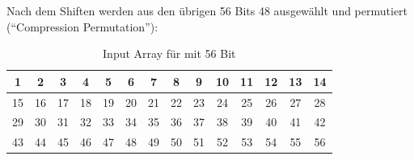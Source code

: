 Nach dem Shiften werden aus den übrigen 56 Bits 48 ausgewählt und permutiert (``Compression Permutation''):

\begin{table}[h]
    \centering
    \begin{tabular}{|*{14}{c|}}
        \hline
        \cellcolor{red-1}1 & \cellcolor{red-1}2 & \cellcolor{red-1}3 & \cellcolor{red-1}4 & 
        \cellcolor{red-1}5 & \cellcolor{red-1}6 & \cellcolor{red-1}7 & \cellcolor{red-1}8 & 
        \cellcolor{orange-1}9 & \cellcolor{orange-1}10 & \cellcolor{orange-1}11 & \cellcolor{orange-1}12 & 
        \cellcolor{orange-1}13 & \cellcolor{orange-1}14\\
        \hline
        \cellcolor{orange-1}15 & \cellcolor{orange-1}16 & 
        \cellcolor{yellow-1}17 & \cellcolor{yellow-1}18 & \cellcolor{yellow-1}19 & \cellcolor{yellow-1}20 & 
        \cellcolor{yellow-1}21 & \cellcolor{yellow-1}22 & \cellcolor{yellow-1}23 & \cellcolor{yellow-1}24 & 
        \cellcolor{green-1}25 & \cellcolor{green-1}26 & \cellcolor{green-1}27 & \cellcolor{green-1}28 \\
        \hline
        \cellcolor{green-1}29 & \cellcolor{green-1}30 & \cellcolor{green-1}31 & \cellcolor{green-1}32 &
        \cellcolor{cyan-1}33 & \cellcolor{cyan-1}34 & \cellcolor{cyan-1}35 & \cellcolor{cyan-1}36 & 
        \cellcolor{cyan-1}37 & \cellcolor{cyan-1}38 & \cellcolor{cyan-1}39 & \cellcolor{cyan-1}40 & 
        \cellcolor{blue-1}41 & \cellcolor{blue-1}42 \\
        \hline 
        \cellcolor{blue-1}43 & \cellcolor{blue-1}44 & 
        \cellcolor{blue-1}45 & \cellcolor{blue-1}46 & \cellcolor{blue-1}47 & \cellcolor{blue-1}48 &
        \cellcolor{purple-1}49 & \cellcolor{purple-1}50 & \cellcolor{purple-1}51 & \cellcolor{purple-1}52 & 
        \cellcolor{purple-1}53 & \cellcolor{purple-1}54 & \cellcolor{purple-1}55 & \cellcolor{purple-1}56 \\
        \hline
    \end{tabular}
    \caption{Input Array für mit 56 Bit}
\end{table}

